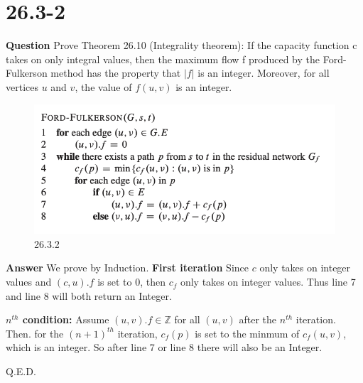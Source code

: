\documentclass[12pt]{article}
\begin{document}
\section{26.3-2}
\textbf{Question}
Prove Theorem 26.10 (Integrality theorem):
If the capacity function c takes on only integral values, then the maximum flow f produced by the Ford-Fulkerson method has the property that $|f|$ is an integer. Moreover, for all vertices $u$ and $v$, the value of $f(u,v)$ is an integer.
\begin{figure}[h]
    \centering
    \includegraphics[width=\linewidth]{26.3.2}
    \caption{26.3.2}
    \label{fig:ford-fulkerson}

\end{figure}
\textbf{Answer}
We prove by Induction.
\textbf{First iteration} Since $c$ only takes on integer values and $(c,u) . f$ is set to 0, then $c_f$ only takes on integer values. Thus line 7 and line 8 will both return an Integer.

\textbf{$n^{th}$ condition: } Assume $(u,v).f \in \mathbb Z$ for all $(u,v)$ after the $n^{th}$ iteration. Then. for the $(n+1)^{th}$ iteration, $c_f(p)$ is set to the minmum of $c_f(u,v)$, which is an integer. So after line 7 or line 8 there will also be an Integer.

Q.E.D.
\end{document}
